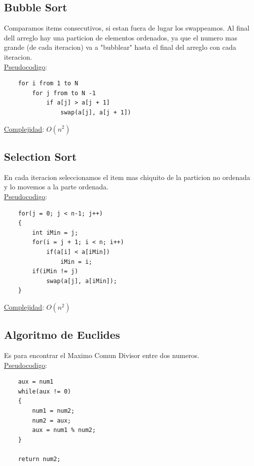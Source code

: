 \documentclass{article}
\begin{document}
\subsection*{Bubble Sort}
Comparamos items consecutivos, si estan fuera de lugar los swappeamos.
Al final dell arreglo hay una particion de elementos ordenados, ya que 
el numero mas grande (de cada iteracion) va a "bubblear" hasta el final del arreglo con cada iteracion.
\\\underline{Pseudocodigo}:
\begin{lstlisting}
    for i from 1 to N
        for j from to N -1 
            if a[j] > a[j + 1]
                swap(a[j], a[j + 1])
\end{lstlisting}
\underline{Complejidad}: $O(n^2)$

\subsection*{Selection Sort}
En cada iteracion seleccionamos el item mas chiquito de la particion no ordenada y lo
movemos a la parte ordenada.
\\\underline{Pseudocodigo}:
\begin{lstlisting}
    for(j = 0; j < n-1; j++)
    {
        int iMin = j;
        for(i = j + 1; i < n; i++)
            if(a[i] < a[iMin])
                iMin = i;
        if(iMin != j)
            swap(a[j], a[iMin]);
    }
\end{lstlisting}
\underline{Complejidad}: $O(n^2)$

\subsection*{Algoritmo de Euclides}
Es para encontrar el Maximo Comun Divisor entre dos numeros.
\\\underline{Pseudocodigo}:
\begin{lstlisting}
    aux = num1
    while(aux != 0)
    {
        num1 = num2;
        num2 = aux;
        aux = num1 % num2;
    }

    return num2;
\end{lstlisting}
\end{document}
